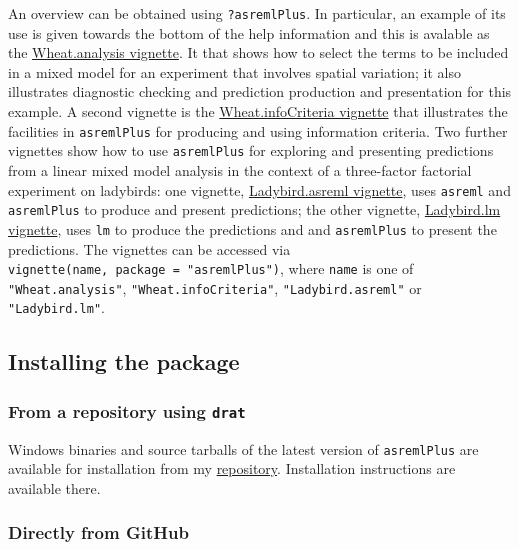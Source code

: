 \documentclass[
]{article}
\begin{document}
An overview can be obtained using \texttt{?asremlPlus}. In particular,
an example of its use is given towards the bottom of the help
information and this is avalable as the
\href{./vignettes/Wheat.analysis.pdf}{Wheat.analysis vignette}. It that
shows how to select the terms to be included in a mixed model for an
experiment that involves spatial variation; it also illustrates
diagnostic checking and prediction production and presentation for this
example. A second vignette is the
\href{./vignettes/Wheat.infoCriteria.pdf}{Wheat.infoCriteria vignette}
that illustrates the facilities in \texttt{asremlPlus} for producing and
using information criteria. Two further vignettes show how to use
\texttt{asremlPlus} for exploring and presenting predictions from a
linear mixed model analysis in the context of a three-factor factorial
experiment on ladybirds: one vignette,
\href{./vignettes/Ladybird.asreml.pdf}{Ladybird.asreml vignette}, uses
\texttt{asreml} and \texttt{asremlPlus} to produce and present
predictions; the other vignette,
\href{./vignettes/Ladybird.asreml.pdf}{Ladybird.lm vignette}, uses
\texttt{lm} to produce the predictions and and \texttt{asremlPlus} to
present the predictions. The vignettes can be accessed via
\texttt{vignette(name,\ package\ =\ "asremlPlus")}, where \texttt{name}
is one of \texttt{"Wheat.analysis"}, \texttt{"Wheat.infoCriteria"},
\texttt{"Ladybird.asreml"} or \texttt{"Ladybird.lm"}.

\hypertarget{installing-the-package}{%
\subsection{Installing the package}\label{installing-the-package}}

\hypertarget{from-a-repository-using-drat}{%
\subsubsection{\texorpdfstring{From a repository using
\texttt{drat}}{From a repository using drat}}\label{from-a-repository-using-drat}}

Windows binaries and source tarballs of the latest version of
\texttt{asremlPlus} are available for installation from my
\href{http://chris.brien.name/rpackages}{repository}. Installation
instructions are available there.

\hypertarget{directly-from-github}{%
\subsubsection{Directly from GitHub}\label{directly-from-github}}
\end{document}
